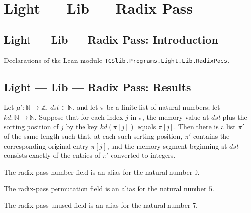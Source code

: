 \section{Light --- Lib --- Radix Pass}
\subsection*{Light --- Lib --- Radix Pass: Introduction}

Declarations of the Lean module \texttt{TCSlib.Programs.Light.Lib.RadixPass}.

\subsection*{Light --- Lib --- Radix Pass: Results}

\begin{theorem}
\label{Light.exists_stablePass}
\leanok
{}
Let $\mu':\mathbb N\to\mathbb Z$, $dst\in\mathbb N$, and let $\pi$ be a finite list of
natural numbers; let $kd:\mathbb N\to\mathbb N$. Suppose that for each index $j$ in
$\pi$, the memory value at $dst$ plus the sorting position of $j$ by the key
$kd(\pi[j])$ equals $\pi[j]$. Then there is a list $\pi'$ of the same length such that,
at each such sorting position, $\pi'$ contains the corresponding original entry
$\pi[j]$, and the memory segment beginning at $dst$ consists exactly of the entries of
$\pi'$ converted to integers.
\end{theorem}

\begin{definition}
\label{Light.RadixPass.Num}
\leanok
The radix-pass number field is an alias for the natural number $0$.
\end{definition}

\begin{definition}
\label{Light.RadixPass.Perm}
\leanok
{}
The radix-pass permutation field is an alias for the natural number $5$.
\end{definition}

\begin{definition}
\label{Light.RadixPass.Unused}
\leanok
{}
The radix-pass unused field is an alias for the natural number $7$.
\end{definition}

